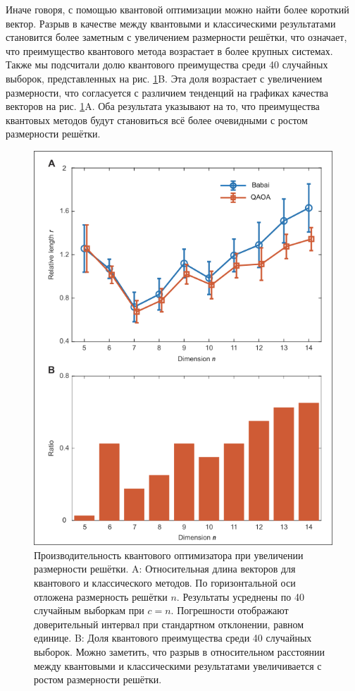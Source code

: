 Иначе говоря, с помощью квантовой оптимизации можно найти более короткий
вектор. Разрыв в качестве между квантовыми и классическими результатами
становится более заметным с увеличением размерности решётки, что означает, что
преимущество квантового метода возрастает в более крупных системах. Также мы
подсчитали долю квантового преимущества среди 40 случайных выборок,
представленных на рис. \ref{fig:fig10}B. Эта доля возрастает с увеличением
размерности, что согласуется с различием тенденций на графиках качества
векторов на рис. \ref{fig:fig10}A. Оба результата указывают на то, что
преимущества квантовых методов будут становиться всё более очевидными с ростом
размерности решётки.

\begin{figure}
    \centering
    \includegraphics[scale=0.6]{inc/fig_10.png}
    \caption{
    Производительность квантового оптимизатора при увеличении размерности
    решётки. A: Относительная длина векторов для квантового и классического
    методов. По горизонтальной оси отложена размерность решётки $n$. Результаты
    усреднены по 40 случайным выборкам при $c = n$. Погрешности отображают
    доверительный интервал при стандартном отклонении, равном единице. B: Доля
    квантового преимущества среди 40 случайных выборок. Можно заметить, что
    разрыв в относительном расстоянии между квантовыми и классическими
    результатами увеличивается с ростом размерности решётки.
    }
    \label{fig:fig10}
\end{figure}
